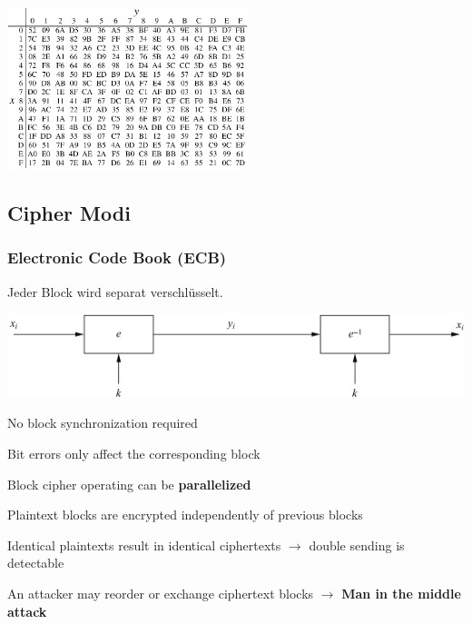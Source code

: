 \documentclass[
  10pt,
  a4paper,
]{article}
\begin{document}
\begin{multicols*}{2}
\begin{center}
\includegraphics[width=7cm,height=\textheight]{images/crypto/invsbox.png}
\end{center}

\subsection{\texorpdfstring{Cipher Modi
\href{https://en.wikipedia.org/wiki/Block_cipher_mode_of_operation\#CTR}{\faWikipediaW}}{Cipher Modi }}\label{cipher-modi}

\subsubsection{Electronic Code Book
(ECB)}\label{electronic-code-book-ecb}

Jeder Block wird separat verschlüsselt.

\includegraphics{images/crypto/image.png}

{\footnotesize\begin{description}[parsep=0mm,labelsep=2pt,labelwidth=8pt]
  \item[\color{OliveGreen}\faPlus] No block synchronization required
  \item[\color{OliveGreen}\faPlus] Bit errors only affect the corresponding block
  \item[\color{OliveGreen}\faPlus] Block cipher operating can be \textbf{parallelized}
  \item[\color{BrickRed}\faMinus] Plaintext blocks are encrypted independently of previous blocks
  \item[\color{BrickRed}\faMinus] Identical plaintexts result in identical ciphertexts $\rightarrow$ double sending is detectable
  \item[\color{BrickRed}\faMinus] An attacker may reorder or exchange ciphertext blocks $\rightarrow$ \textbf{Man in the middle attack}
\end{description}}


\end{multicols*}
\end{document}
